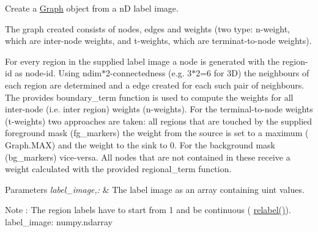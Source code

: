 Create a  \hyperlink{classmedpy_1_1graphcut_1_1graph_1_1Graph}{Graph} object from a nD label image. 

The graph created consists of nodes, edges and weights (two type: n-\/weight, which are inter-\/node weights, and t-\/weights, which are terminat-\/to-\/node weights).

For every region in the supplied label image a node is generated with the region-\/id as node-\/id. Using ndim$\ast$2-\/connectedness (e.g. 3$\ast$2=6 for 3D) the neighbours of each region are determined and a edge created for each such pair of neighbours. The provides boundary\_\-term function is used to compute the weights for all inter-\/node (i.e. inter region) weights (n-\/weights). For the terminal-\/to-\/node weights (t-\/weights) two approaches are taken: all regions that are touched by the supplied foreground mask (fg\_\-markers) the weight from the source is set to a maximum ( Graph.MAX) and the weight to the sink to 0. For the background mask (bg\_\-markers) vice-\/versa. All nodes that are not contained in these receive a weight calculated with the provided regional\_\-term function.


\begin{DoxyParams}{Parameters}
{\em label\_\-image,:} & The label image as an array containing uint values. \\
\hline
\end{DoxyParams}
\begin{DoxyNote}{Note}
: The region labels have to start from 1 and be continuous ( \hyperlink{namespacemedpy_1_1graphcut_1_1graph_a60e9e9c436bdb49797ba09b10d97fb2c}{relabel()}).  label\_\-image: numpy.ndarray 
\end{DoxyNote}

